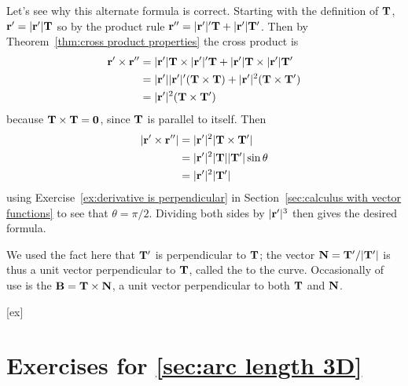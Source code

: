 Let's see why this alternate formula is correct. Starting with the
definition of ${\bf T}$,
${\bf r}'=|{\bf r}'|{\bf T}$ so by the product rule
${\bf r}''=|{\bf r}'|'{\bf T}+|{\bf r}'|{\bf T}'$. Then by
Theorem~\ref{thm:cross product properties} the cross product is
\begin{align*}
{\bf r}'\times{\bf r}''&=|{\bf r}'|{\bf T}\times|{\bf r}'|'{\bf T}+
|{\bf r}'|{\bf T}\times|{\bf r}'|{\bf T}'	\\
&=|{\bf r}'||{\bf r}'|'({\bf T}\times{\bf T})+|{\bf r}'|^2
({\bf T}\times{\bf T}')	\\
&=|{\bf r}'|^2({\bf T}\times{\bf T}')
\end{align*}
because ${\bf T}\times{\bf T}={\bf 0}$, since ${\bf T}$ is
parallel to itself. Then
\begin{align*}
|{\bf r}'\times{\bf r}''|&=|{\bf r}'|^2|{\bf T}\times{\bf T}'|	\\
&=|{\bf r}'|^2|{\bf T}||{\bf T}'|\sin\theta	\\
&=|{\bf r}'|^2|{\bf T}'|
\end{align*}
using Exercise~\ref{ex:derivative is perpendicular} in 
Section~\ref{sec:calculus with vector functions}
to see that $\theta=\pi/2$. Dividing both sides by 
$|{\bf r}'|^3$ then gives the desired formula.

We used the fact here that ${\bf T}'$ is perpendicular to ${\bf T}$;
the vector ${\bf N}={\bf T}'/|{\bf T}'|$ is thus a unit vector
perpendicular to ${\bf T}$, called the  
to the curve. Occasionally of use is the 
${\bf B}={\bf T}\times{\bf N}$, a
unit vector perpendicular to both ${\bf T}$ and ${\bf N}$.



[ex]
\section*{Exercises for \ref{sec:arc length 3D}}

